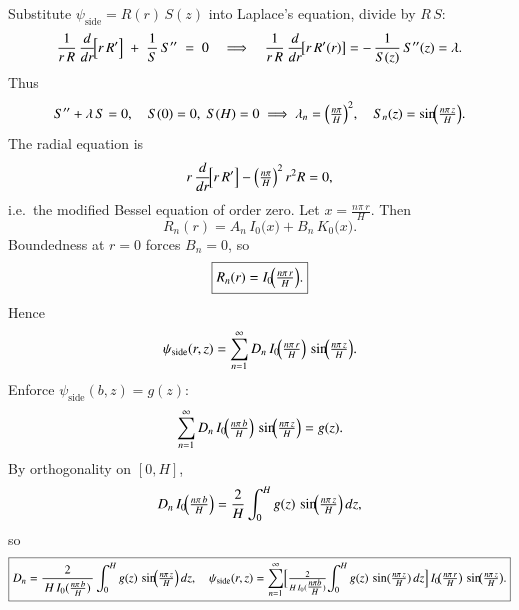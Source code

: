 \documentclass{report}
\begin{document}
\begin{center}

\end{center}

Substitute \(\psi_{\text{side}} = R(r)\,S(z)\) into Laplace’s equation, divide by \(R\,S\):
\[
\frac{1}{r\,R}\,\frac{d}{dr}\!\Bigl[r\,R'\Bigr]
\;+\;
\frac{1}{S}\,S'' \;=\; 0
\quad\Longrightarrow\quad
\frac{1}{r\,R}\,\frac{d}{dr}\!\bigl[r\,R'(r)\bigr]
= -\,\frac{1}{S(z)}\,S''(z) = \lambda.
\]
Thus
\[
S'' + \lambda\,S = 0,\quad S(0)=0,\;S(H)=0 
\;\Longrightarrow\;
\lambda_{n} = \Bigl(\tfrac{n\pi}{H}\Bigr)^{2},\quad
S_{n}(z) = \sin\!\Bigl(\tfrac{n\pi\,z}{H}\Bigr).
\]
The radial equation is
\[
r\,\frac{d}{dr}\!\Bigl[r\,R'\Bigr]
- \Bigl(\tfrac{n\pi}{H}\Bigr)^{2}\,r^{2}R = 0,
\]
i.e.\ the modified Bessel equation of order zero.  Let \(x = \frac{n\pi\,r}{H}\).  Then
\[
R_{n}(r) = A_{n}\,I_{0}\bigl(x\bigr) + B_{n}\,K_{0}\bigl(x\bigr).
\]
Boundedness at \(r=0\) forces \(B_{n}=0\), so
\[
\boxed{%
R_{n}(r) = I_{0}\!\Bigl(\tfrac{n\pi\,r}{H}\Bigr).
}
\]
Hence
\[
\psi_{\text{side}}(r,z)
= \sum_{n=1}^{\infty}
D_{n}\,I_{0}\!\Bigl(\tfrac{n\pi\,r}{H}\Bigr)\,\sin\!\Bigl(\tfrac{n\pi\,z}{H}\Bigr).
\]
Enforce \(\psi_{\text{side}}(b,z)=g(z)\):
\[
\sum_{n=1}^{\infty}
D_{n}\,I_{0}\!\Bigl(\tfrac{n\pi\,b}{H}\Bigr)\,\sin\!\Bigl(\tfrac{n\pi\,z}{H}\Bigr)
= g(z).
\]
By orthogonality on \([0,H]\),
\[
D_{n}\,I_{0}\!\Bigl(\tfrac{n\pi\,b}{H}\Bigr)
= \frac{2}{H}
\int_{0}^{H} g(z)\,\sin\!\Bigl(\tfrac{n\pi\,z}{H}\Bigr)\,dz,
\]
so
\[
\boxed{%
D_{n}
= 
\frac{2}{\,H\,I_{0}(\tfrac{n\pi\,b}{H})\,}
\int_{0}^{H} g(z)\,\sin\!\Bigl(\tfrac{n\pi\,z}{H}\Bigr)\,dz,
\quad
\psi_{\text{side}}(r,z)
= \sum_{n=1}^{\infty}
\Bigl[\tfrac{2}{H\,I_{0}(\tfrac{n\pi b}{H})}\!
\int_{0}^{H} g(z)\,\sin(\tfrac{n\pi\,z}{H})\,dz\Bigr]\,
I_{0}\!\bigl(\tfrac{n\pi\,r}{H}\bigr)\,\sin\!\bigl(\tfrac{n\pi\,z}{H}\bigr).
}
\]
\end{document}
